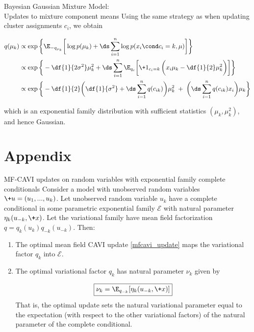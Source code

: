 \documentclass[10pt]{beamer}
\begin{document}
\begin{frame}{Bayesian Gaussian Mixture Model: \\ Updates to mixture component means}
Using the same strategy as when updating cluster assignments $c_i$, we obtain

\begin{align*}
q(\mu_k) & \propto \exp \bigg\{ \E_{-q_{\mu_k}} \bigg[  \log p(\mu_k) + \ds\sum_{i=1}^n \log p(x_i \cond c_i=k, \mu) \bigg] \bigg\} \\
& \propto \exp \bigg\{ -\df{1}{2  \sigma^2} \mu_k^2 +  \ds\sum_{i=1}^{n} \E_{q_c} \bigg[ \+1_{c_i=k}\, \bigg(x_i \mu_k - \df{1}{2} \mu_k^2\bigg) \bigg] \bigg\} \\
& \propto \exp \bigg\{ -\df{1}{2} \bigg(\df{1}{ \sigma^2} + \ds\sum_{i=1}^n q(c_{ik}) \bigg) \mu_k^2 \; +  \;  \bigg( \ds\sum_{i=1}^n q(c_{ik})x_i  \bigg) \mu_k \bigg\} \\
\end{align*}

which is an exponential family distribution with sufficient statistics $(\mu_k, \mu_k^2)$, and hence Gaussian.

\end{frame}




\section{Appendix}

\begin{frame}{MF-CAVI updates on random variables with exponential family complete conditionals} 
Consider a model with unobserved random variables $\+u=(u_1,...,u_k)$.  Let unobserved random variable $u_k$ have a complete conditional in some parametric exponential family $\mathcal{E}$ with natural parameter $\eta_k(u_{-k}, \+x)$.  Let the variational family have mean field factorization $q=q_k(u_k)q_{-k}(u_{-k})$. Then:

\begin{enumerate}
\item The optimal mean field CAVI update \eqref{mfcavi_update} maps the variational factor $q_k$ into $\mathcal{E}$.   \pause 

\item The optimal variational factor $q_k$ has natural parameter $\nu_k$ given by

\begin{align}
\label{eqn:mf_cavi_efcc}
\boxed{\nu_k = \E_{q_{-k}} [\eta_k(u_{-k}, \+x)]}
\end{align}
\pause 
That is, the optimal update sets the natural variational parameter equal to the expectation (with respect to the other variational factors) of the natural parameter of the complete conditional.
\end{enumerate}

\end{frame}
\end{document}
